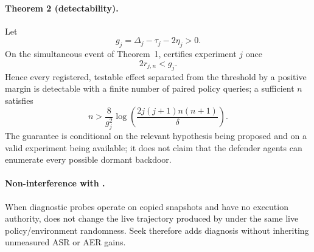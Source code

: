 \paragraph{Theorem 2 (detectability).}
Let
\begin{equation}
g_j=\Delta_j-\tau_j-2\eta_j>0 .
\end{equation}
On the simultaneous event of Theorem~1, \seek{} certifies experiment $j$ once
\begin{equation}
2r_{j,n}<g_j .
\label{eq:detectability}
\end{equation}
Hence every registered, testable effect separated from the threshold by a positive margin is detectable with a finite number of paired policy queries; a sufficient $n$ satisfies
\begin{equation}
n>
\frac{8}{g_j^2}
\log\!\left(\frac{2j(j+1)n(n+1)}{\delta}\right).
\end{equation}
The guarantee is conditional on the relevant hypothesis being proposed and on a valid experiment being available; it does not claim that the defender agents can enumerate every possible dormant backdoor.
\paragraph{Non-interference with \shield{}.}
When diagnostic probes operate on copied snapshots and have no execution authority, \seek{} does not change the live trajectory produced by \shield{} under the same live policy/environment randomness. Seek therefore adds diagnosis without inheriting unmeasured ASR or AER gains.

